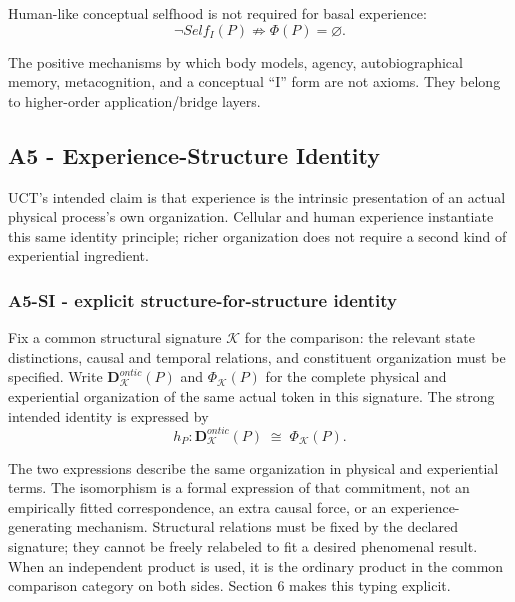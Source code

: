 \documentclass[
  11pt,
  a4paper,
]{article}
\begin{document}
Human-like conceptual selfhood is not required for basal experience:
\nopagebreak[4]
\[
\boxed{
\neg Self_I(P)
\not\Rightarrow
\Phi(P)=\varnothing.
}
\]

The positive mechanisms by which body models, agency, autobiographical
memory, metacognition, and a conceptual ``I'' form are not axioms. They
belong to higher-order application/bridge layers.

\hypertarget{a5---experience-structure-identity}{%
\subsection{A5 - Experience-Structure
Identity}\label{a5---experience-structure-identity}}

UCT's intended claim is that experience is the intrinsic presentation of
an actual physical process's own organization. Cellular and human
experience instantiate this same identity principle; richer organization
does not require a second kind of experiential ingredient.

\hypertarget{a5-si---explicit-structure-for-structure-identity}{%
\subsubsection{A5-SI - explicit structure-for-structure
identity}\label{a5-si---explicit-structure-for-structure-identity}}

Fix a common structural signature \(\mathcal K\) for the comparison: the
relevant state distinctions, causal and temporal relations, and
constituent organization must be specified. Write
\(\mathbf D^{ontic}_{\mathcal K}(P)\) and \(\Phi_{\mathcal K}(P)\) for
the complete physical and experiential organization of the same actual
token in this signature. The strong intended identity is expressed by
\nopagebreak[4]
\[
h_P:\mathbf D^{ontic}_{\mathcal K}(P)
\;\cong\;\Phi_{\mathcal K}(P).
\]

The two expressions describe the same organization in physical and
experiential terms. The isomorphism is a formal expression of that
commitment, not an empirically fitted correspondence, an extra causal
force, or an experience-generating mechanism. Structural relations must
be fixed by the declared signature; they cannot be freely relabeled to
fit a desired phenomenal result. When an independent product is used, it
is the ordinary product in the common comparison category on both sides.
Section 6 makes this typing explicit.
\end{document}
